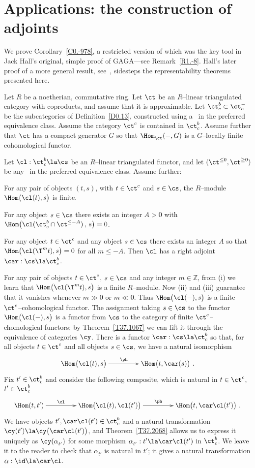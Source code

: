 \documentclass[11pt]{amsart}
\newcommand{\zz}{{\mathbb Z}}
\begin{document}
\section{Applications: the construction of adjoints}
\label{S73}

We prove Corollary~\ref{C0.-978}, a restricted version of
which was the key tool in Jack Hall's
original, simple proof of
GAGA---see Remark~\ref{R1.-8}. Hall's later proof of a more general result,
see~\cite{Hall18},
sidesteps the representability theorems presented here.

Let $R$ be a noetherian, commutative ring.
Let $\ct$ be an $R$--linear triangulated category with coproducts, and assume
that it is approximable. Let $\ct^b_c\subset\ct^-_c$
be the subcategories of Definition~\ref{D0.13}, constructed
using a \tstr\ in the preferred equivalence class.
Assume the category $\ct^c$ is contained in $\ct^b_c$.
Assume further that $\ct$  has a compact
generator $G$ so that $\Hom_\ct^{}(-,G)$ is a $G$--locally finite
cohomological functor.

Let $\cl:\ct^b_c\la\cs$ be an $R$--linear triangulated functor, and
let $(\ct^{\leq0},\ct^{\geq0})$ be any \tstr\ in the preferred equivalence class.
Assume further:
\be
\item
  For any pair of objects $(t,s)$, with $t\in\ct^c$
  and $s\in\cs$, the $R$--module
  $\Hom\big(\cl(t),s\big)$ is finite.
\item
  For any object $s\in\cs$ there exists an integer $A>0$ with
  $\Hom\big(\cl(\ct^b_c\cap\ct^{\leq-A})\,,\,s\big)=0$.
\item
  For any object $t\in\ct^c$ and any object $s\in\cs$ there exists an integer
  $A$ so that $\Hom\big(\cl(\T^mt),s\big)=0$ for all $m\leq-A$.
\ee
Then $\cl$ has a right adjoint $\car:\cs\la\ct^b_c$.
\ethm

\prf
For any pair of objects $t\in\ct^c$, $s\in\cs$ and any integer $m\in\zz$, from
(i) we learn that $\Hom\big(\cl(\T^mt),s\big)$ is a finite $R$--module.
Now (ii) and (iii) guarantee that it vanishes
whenever $m\gg0$ or $m\ll0$. Thus $\Hom\big(\cl(-),s\big)$ is a
finite $\ct^c$--cohomological functor. The assignment
taking $s\in\cs$ to the functor $\Hom\big(\cl(-),s\big)$ is
a functor from $\cs$ to the category of finite $\ct^c$--chomological
functors; by Theorem~\ref{T37.1067} we can lift it through the
equivalence of categories $\cy$.
There is a functor $\car:\cs\la\ct^b_c$ so that,
for all objects $t\in\ct^c$ and all objects $s\in\cs$, we have
a natural isomorphism
\[\xymatrix@C+20pt{
\Hom\big(\cl(t),s\big)\ar[r]^-{\ph} & \Hom\big(t,\car(s)\big)\ .
}\]
Fix $t'\in\ct^b_c$ and consider the following composite, which is
natural in $t\in\ct^c$, $t'\in\ct^b_c$
\[\xymatrix@C+20pt{
  \Hom(t,t')\ar[r]^-{\cl}&\Hom\big(\cl(t),\cl(t')\big)\ar[r]^-{\ph}
  &\Hom\big(t,\car\cl(t')\big)\ .
}\]
We have objects $t',\car\cl(t')\in\ct^b_c$ and a natural
transformation $\cy(t')\la \cy\big(\car\cl(t')\big)$,
and Theorem~\ref{T37.2068} allows us to express it uniquely as
$\cy(\alpha_{t'}^{})$ for some morphism $\alpha_{t'}^{}:t'\la \car\cl(t')$
in $\ct^b_c$. We leave it to the reader to check that $\alpha_{t'}^{}$
is natural in $t'$; it gives a natural transformation $\alpha:\id\la \car\cl$.
\end{document}
